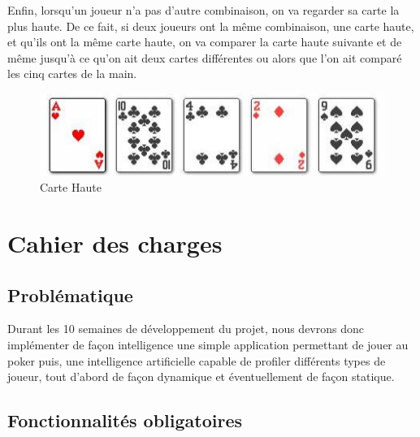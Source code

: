 \documentclass{report}
\begin{document}
Enfin, lorsqu'un joueur n'a pas d'autre combinaison, on va regarder sa carte la plus haute. De ce fait, si deux joueurs ont la même combinaison, une carte haute, et qu'ils ont la même carte haute, on va comparer la carte haute suivante et de même jusqu'à ce qu'on ait deux cartes différentes ou alors que l'on ait comparé les cinq cartes de la main. \par
		\begin{figure}[h]
			\begin{center}
				\includegraphics[scale=0.4]{./imagesRapport/carteHaute.jpg}
			\end{center}
			\caption[Carte Haute]{Carte Haute}
		\end{figure}
		\medskip

\section{Cahier des charges}
\subsection{Problématique}
\hspace{0.5cm}Durant les 10 semaines de développement du projet, nous devrons donc implémenter de façon intelligence une simple application permettant de jouer au poker puis, une intelligence artificielle capable de profiler différents types de joueur, tout d'abord de façon dynamique et éventuellement de façon statique. 
\subsection{Fonctionnalités obligatoires}
\end{document}
